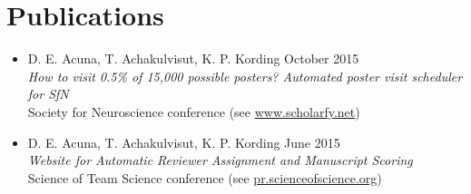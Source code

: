 \section{\sc Publications}

\begin{itemize}[leftmargin=0cm, label={}]

\item D. E. Acuna, T. Achakulvisut, K. P. Kording \hfill October 2015\\
{\em How to visit 0.5\% of 15,000 possible posters? Automated poster visit scheduler for SfN}\\ Society for Neuroscience conference (see \href{http://www.scholarfy.net/}{www.scholarfy.net})

\item D. E. Acuna, T. Achakulvisut, K. P. Kording \hfill June 2015\\
{\em Website for Automatic Reviewer Assignment and Manuscript Scoring}\\
Science of Team Science conference (see \href{http://pr.scienceofscience.org/}{pr.scienceofscience.org})

\end{itemize}
